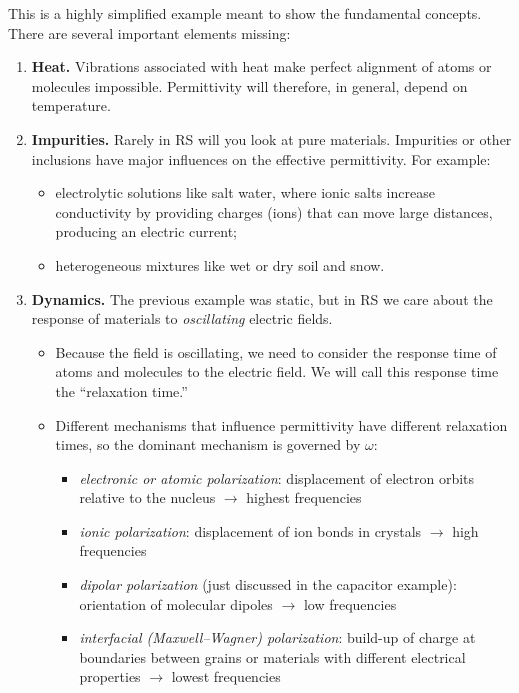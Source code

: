 \documentclass[11pt, oneside]{article}
\begin{document}
This is a highly simplified example meant to show the fundamental concepts. There are several important elements missing:
\begin{enumerate}
	\item \textbf{Heat.} Vibrations associated with heat make perfect alignment of atoms or molecules impossible. Permittivity will therefore, in general, depend on temperature.
	\item \textbf{Impurities.} Rarely in RS will you look at pure materials. Impurities or other inclusions have major influences on the effective permittivity. For example:
	\begin{itemize}
		\item electrolytic solutions like salt water, where ionic salts increase conductivity by providing charges (ions) that can move large distances, producing an electric current;
		\item heterogeneous mixtures like wet or dry soil and snow.
	\end{itemize}
	\item \textbf{Dynamics.} The previous example was static, but in RS we care about the response of materials to \emph{oscillating} electric fields.
	\begin{itemize}
		\item Because the field is oscillating, we need to consider the response time of atoms and molecules to the electric field. We will call this response time the ``relaxation time.''
		\item Different mechanisms that influence permittivity have different relaxation times, so the dominant mechanism is governed by $\omega$:
		\begin{itemize}
			\item \emph{electronic or atomic polarization}: displacement of electron orbits relative to the nucleus $\rightarrow$ highest frequencies
			\item \emph{ionic polarization}: displacement of ion bonds in crystals $\rightarrow$ high frequencies
			\item \emph{dipolar polarization} (just discussed in the capacitor example): orientation of molecular dipoles $\rightarrow$ low frequencies
			\item \emph{interfacial (Maxwell--Wagner) polarization}: build-up of charge at boundaries between grains or materials with different electrical properties $\rightarrow$ lowest frequencies
		\end{itemize}
	\end{itemize}
\end{enumerate}
\end{document}
